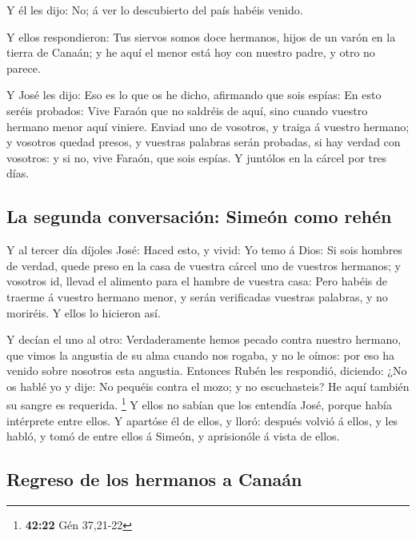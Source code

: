  Y él les dijo: No; á ver lo descubierto del país habéis
venido.

 Y ellos respondieron: Tus siervos somos doce hermanos,
hijos de un varón en la tierra de Canaán; y he aquí el menor está hoy
con nuestro padre, y otro no parece.

 Y José les dijo: Eso es lo que os he dicho, afirmando
que sois espías:  En esto seréis probados: Vive Faraón
que no saldréis de aquí, sino cuando vuestro hermano menor aquí viniere.
 Enviad uno de vosotros, y traiga á vuestro hermano; y
vosotros quedad presos, y vuestras palabras serán probadas, si hay
verdad con vosotros: y si no, vive Faraón, que sois espías.
 Y juntólos en la cárcel por tres días.

\hypertarget{la-segunda-conversaciuxf3n-simeuxf3n-como-rehuxe9n}{%
\subsection{La segunda conversación: Simeón como
rehén}\label{la-segunda-conversaciuxf3n-simeuxf3n-como-rehuxe9n}}

 Y al tercer día díjoles José: Haced esto, y vivid: Yo
temo á Dios:  Si sois hombres de verdad, quede preso en
la casa de vuestra cárcel uno de vuestros hermanos; y vosotros id,
llevad el alimento para el hambre de vuestra casa:  Pero
habéis de traerme á vuestro hermano menor, y serán verificadas vuestras
palabras, y no moriréis. Y ellos lo hicieron así.

 Y decían el uno al otro: Verdaderamente hemos pecado
contra nuestro hermano, que vimos la angustia de su alma cuando nos
rogaba, y no le oímos: por eso ha venido sobre nosotros esta angustia.
 Entonces Rubén les respondió, diciendo: ¿No os hablé yo
y dije: No pequéis contra el mozo; y no escuchasteis? He aquí también su
sangre es requerida. \footnote{\textbf{42:22} Gén 37,21-22}
 Y ellos no sabían que los entendía José, porque había
intérprete entre ellos.  Y apartóse él de ellos, y lloró:
después volvió á ellos, y les habló, y tomó de entre ellos á Simeón, y
aprisionóle á vista de ellos.

\hypertarget{regreso-de-los-hermanos-a-canauxe1n}{%
\subsection{Regreso de los hermanos a
Canaán}\label{regreso-de-los-hermanos-a-canauxe1n}}


